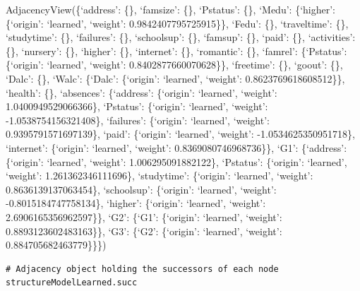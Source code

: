 \documentclass[
]{article}
\begin{document}
AdjacencyView(\{`address': \{\}, `famsize': \{\}, `Pstatus': \{\},
`Medu': \{`higher': \{`origin': `learned', `weight':
0.9842407795725915\}\}, `Fedu': \{\}, `traveltime': \{\}, `studytime':
\{\}, `failures': \{\}, `schoolsup': \{\}, `famsup': \{\}, `paid': \{\},
`activities': \{\}, `nursery': \{\}, `higher': \{\}, `internet': \{\},
`romantic': \{\}, `famrel': \{`Pstatus': \{`origin': `learned',
`weight': 0.8402877660070628\}\}, `freetime': \{\}, `goout': \{\},
`Dalc': \{\}, `Walc': \{`Dalc': \{`origin': `learned', `weight':
0.8623769618608512\}\}, `health': \{\}, `absences': \{`address':
\{`origin': `learned', `weight': 1.0400949529066366\}, `Pstatus':
\{`origin': `learned', `weight': -1.0538754156321408\}, `failures':
\{`origin': `learned', `weight': 0.9395791571697139\}, `paid':
\{`origin': `learned', `weight': -1.0534625350951718\}, `internet':
\{`origin': `learned', `weight': 0.8369080746968736\}\}, `G1':
\{`address': \{`origin': `learned', `weight': 1.006295091882122\},
`Pstatus': \{`origin': `learned', `weight': 1.261362346111696\},
`studytime': \{`origin': `learned', `weight': 0.8636139137063454\},
`schoolsup': \{`origin': `learned', `weight': -0.8015184747758134\},
`higher': \{`origin': `learned', `weight': 2.6906165356962597\}\}, `G2':
\{`G1': \{`origin': `learned', `weight': 0.8893123602483163\}\}, `G3':
\{`G2': \{`origin': `learned', `weight': 0.884705682463779\}\}\})

\begin{verbatim}
# Adjacency object holding the successors of each node
structureModelLearned.succ
\end{verbatim}
\end{document}
